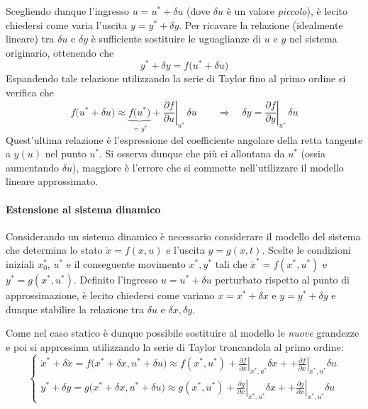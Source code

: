  	Scegliendo dunque l'ingresso $u=u^*+\delta u$ (dove $\delta u$ è un valore \textit{piccolo}), è lecito chiedersi come varia l'uscita $y = y^* + \delta y$. Per ricavare la relazione (idealmente lineare) tra $\delta u$ e $\delta y$ è sufficiente sostituire le uguaglianze di $u$ e $y$ nel sistema originario, ottenendo che
 	\[ y^* + \delta y = f\big(u^*+\delta u\big) \]
 	Espandendo tale relazione utilizzando la serie di Taylor fino al primo ordine si verifica che
 	\[  f\big(u^* + \delta u\big) \approx \underbrace{f\big(u^*\big)}_{=y^*} + \left. \frac{\partial f}{\partial u} \right|_{u^*} \,\delta u \qquad \Rightarrow \quad \delta y = \left.\frac{\partial f}{\partial y}\right|_{u^*}\, \delta u\]
 	Quest'ultima relazione è l'espressione del coefficiente angolare della retta tangente a $y(u)$ nel punto $u^*$.  	
 	Si osserva dunque che più ci allontana da $u^*$ (ossia aumentando $\delta u$), maggiore è l'errore che si commette nell'utilizzare il modello lineare approssimato.
 	
 	\paragraph{Estensione al sistema dinamico} Considerando un sistema dinamico è necessario considerare il modello del sistema che determina lo stato $\dot x = f(x,u)$ e l'uscita $y=g(x,t)$. Scelte le condizioni iniziali $x_0^*$, $u^*$ e il conseguente movimento $x^*, y^*$ tali che $\dot x^* = f(x^*,u^*)$ e $y^*=g(x^*, u^*)$. Definito l'ingresso $u=u^*+\delta u$ perturbato rispetto al punto di approssimazione, è lecito chiedersi come variano $x=x^*+\delta x$ e $y=y^*+\delta y$ e dunque stabilire la relazione tra $\delta u$ e $\delta x, \delta y$.
 	
 	Come nel caso statico è dunque possibile sostituire al modello le \textit{ nuove} grandezze e poi si approssima utilizzando la serie di Taylor troncandola al primo ordine:
 	\[\begin{cases}
 		\dot x^* + \delta \dot x = f\big(x^*+\delta x, u^*+\delta u\big) \approx f(x^*,u^*) + \left. \frac{\partial f}{\partial x} \right|_{x^*,u^*} \delta x + + \left. \frac{\partial f}{\partial x} \right|_{x^*,u^*} \delta u \\ 
 		y^* + \delta y = g\big(x^* + \delta x, u^* + \delta u\big) \approx g(x^*,u^*) + \left. \frac{\partial g}{\partial x} \right|_{x^*,u^*} \delta x + + \left. \frac{\partial g}{\partial x} \right|_{x^*,u^*} \delta u
 	\end{cases} \]
 	
